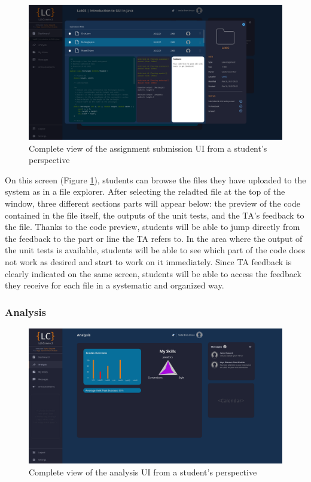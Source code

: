 \documentclass[a4paper, 12pt]{article}
\begin{document}
    \begin{figure}[H]
        \centering
        \includegraphics[width=\textwidth]{student_assignment_submission}
        \caption{Complete view of the assignment submission UI from a student's perspective}
        \label{fig:student_assignment_submission_full}
    \end{figure}

    On this screen (Figure \ref{fig:student_assignment_submission_full}), students can browse the files they have uploaded to the system as in a file explorer. 
    After selecting the reladted file at the top of the window, three different sections parts will appear below: the preview of the code contained in the file itself, 
    the outputs of the unit tests, and the TA's feedback to the file. Thanks to the code preview, students will be able to jump directly from the feedback 
    to the part or line the TA refers to. In the area where the output of the unit tests is available, students will be able to see which part of the code does not 
    work as desired and start to work on it immediately. Since TA feedback is clearly indicated on the same screen, students will be able to access the feedback they 
    receive for each file in a systematic and organized way.

    \pagebreak
    
    \subsubsection{Analysis}
    
    \begin{figure}[H]
        \centering
        \includegraphics[width=\textwidth]{student_analysis}
        \caption{Complete view of the analysis UI from a student's perspective}
        \label{fig:student_analysis_full}
    \end{figure}
    
\end{document}
